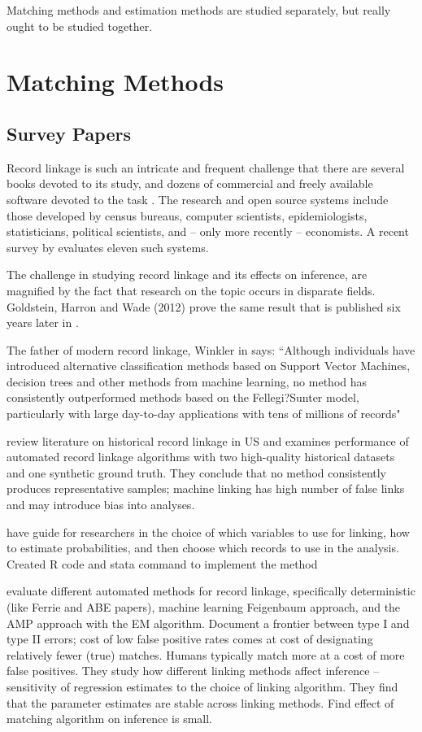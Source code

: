 \documentclass[12pt]{article}
\begin{document}
Matching methods and estimation methods are studied separately, but really ought to be studied together. 

\section{Matching Methods}

\subsection{Survey Papers}

Record linkage is such an intricate and frequent challenge that there are several books devoted to its study, and dozens of commercial and freely available software devoted to the task \citep{christen2012, herzog07}.  The research and open source systems include those developed by census bureaus, computer scientists, epidemiologists, statisticians, political scientists, and -- only more recently -- economists.  A recent survey by \cite{kopcke2010} evaluates eleven such systems.  

The challenge in studying record linkage and its effects on inference, are magnified by the fact that research on the topic occurs in disparate fields.  Goldstein, Harron and Wade (2012) prove the same result that is published six years later in \cite{hirukawa2018}. 

The father of modern record linkage, Winkler in \cite{christen2012} says: ``Although individuals have introduced alternative classification methods based on Support Vector Machines, decision trees and other
methods from machine learning, no method has consistently outperformed methods
based on the Fellegi?Sunter model, particularly with large day-to-day applications
with tens of millions of records"

\cite{bailey2017} review literature on historical record linkage in US and examines performance of automated record linkage algorithms with two high-quality historical datasets and one synthetic ground truth.  They conclude that no method consistently produces representative samples; machine linking has high number of false links and may introduce bias into analyses.  

\cite{arp2018} have guide for researchers in the choice of which variables to use for linking, how to estimate probabilities, and then choose which records to use in the analysis.  Created R code and stata command to implement the method

\cite{abe2019} evaluate different automated methods for record linkage, specifically deterministic (like Ferrie and ABE papers), machine learning Feigenbaum approach, and the AMP approach with the EM algorithm.  Document a frontier between type I and type II errors; cost of low false positive rates comes at cost of designating relatively fewer (true) matches.  Humans typically match more at a cost of more false positives.  They study how different linking methods affect inference -- sensitivity of regression estimates to the choice of linking algorithm.  They find that the parameter estimates are stable across linking methods.  Find effect of matching algorithm on inference is small. 
\end{document}

